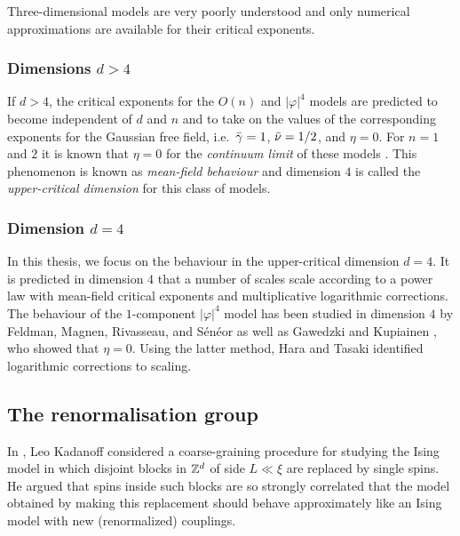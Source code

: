 Three-dimensional models are very poorly understood and only numerical approximations
are available for their critical exponents.

\subsubsection{Dimensions $d > 4$}

If $d > 4$, the critical exponents for the $O(n)$ and $|\varphi|^4$ models are
predicted to become independent of $d$ and $n$ and to take on the values of the
corresponding exponents for the Gaussian free field, i.e.\ $\bar\gamma = 1$,
$\bar\nu = 1/2$, and $\eta = 0$. For $n = 1$ and $2$ it is known that $\eta = 0$
for the \emph{continuum limit} of these models \cite{Aiz82,Fro82}.
This phenomenon is known as \emph{mean-field behaviour} and dimension $4$ is
called the \emph{upper-critical dimension} for this class of models.

\subsubsection{Dimension $d = 4$}

In this thesis, we focus on the behaviour in the upper-critical dimension $d = 4$.
It is predicted in dimension $4$ that a number of scales scale according to a
power law with mean-field critical exponents and multiplicative logarithmic
corrections. The behaviour of the $1$-component $|\varphi|^4$ model has been
studied in dimension $4$ by Feldman, Magnen, Rivasseau, and S\'{e}n\'{e}or
\cite{FMRS87} as well as Gawedzki and Kupiainen \cite{GK85}, who showed
that $\eta = 0$. Using the latter method, Hara and Tasaki \cite{HT87} identified
logarithmic corrections to scaling.


\subsection{The renormalisation group}

In \cite{Kada66}, Leo Kadanoff considered a coarse-graining procedure for
studying the Ising model in which disjoint
blocks in ${ {{\mathbb Z}}^d }$ of side $L \ll \xi$ are replaced by single spins. He argued
that spins inside such blocks are so strongly correlated that the model
obtained by making this replacement should behave approximately like an Ising
model with new (renormalized) couplings.

